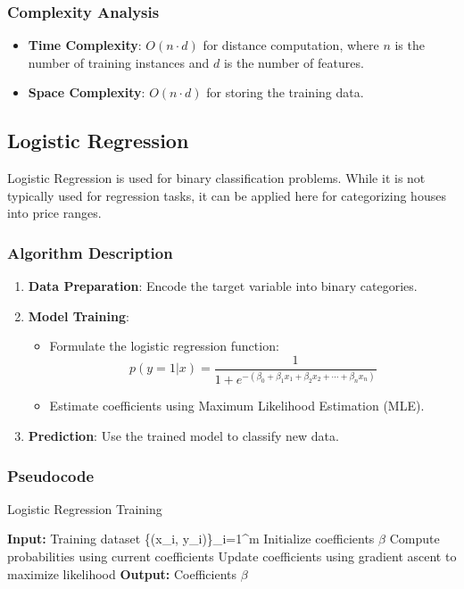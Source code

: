 \documentclass[10pt,conference,compsoc]{IEEEtran}
\begin{document}
{\subsubsection{Complexity Analysis}

\begin{itemize}
    \item \textbf{Time Complexity}: \(O(n \cdot d)\) for distance computation, where \(n\) is the number of training instances and \(d\) is the number of features.
    \item \textbf{Space Complexity}: \(O(n \cdot d)\) for storing the training data.
\end{itemize}

\subsection{Logistic Regression}

Logistic Regression is used for binary classification problems. While it is not typically used for regression tasks, it can be applied here for categorizing houses into price ranges.

\subsubsection{Algorithm Description}

\begin{enumerate}
    \item \textbf{Data Preparation}: Encode the target variable into binary categories.
    \item \textbf{Model Training}:
    \begin{itemize}
        \item Formulate the logistic regression function:
        \[
        p(y=1|x) = \frac{1}{1 + e^{-(\beta_0 + \beta_1 x_1 + \beta_2 x_2 + \cdots + \beta_n x_n)}}
        \]
        \item Estimate coefficients using Maximum Likelihood Estimation (MLE).
    \end{itemize}
    \item \textbf{Prediction}: Use the trained model to classify new data.
\end{enumerate}

\subsubsection{Pseudocode}

\begin{algorithm}
\caption{Logistic Regression Training}
\begin{algorithmic}[1]
\STATE \textbf{Input:} Training dataset \{(x_i, y_i)\}_{i=1}^m
\STATE Initialize coefficients \(\beta\)
\REPEAT
    \STATE Compute probabilities using current coefficients
    \STATE Update coefficients using gradient ascent to maximize likelihood
\STATE \textbf{Output:} Coefficients \(\beta\)
\end{algorithmic}
\end{algorithm}

}
\end{document}
